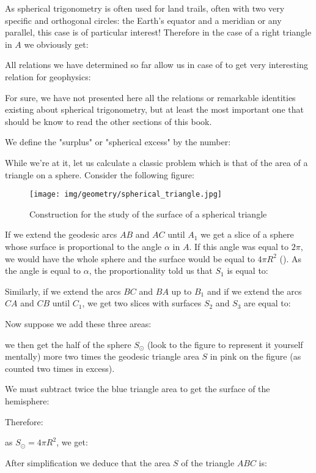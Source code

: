 	As spherical trigonometry is often used for land trails, often with two very specific and orthogonal circles: the Earth's equator and a meridian or any parallel, this case is of particular interest! Therefore in the case of a right triangle in $A$ we obviously get:
	
	All relations we have determined so far allow us in case of to get very interesting relation for geophysics:
	
	For sure, we have not presented here all the relations or remarkable identities existing about spherical trigonometry, but at least the most important one that should be know to read the other sections of this book.
	\begin{tcolorbox}[title=Remark,colframe=black,arc=10pt]
	We define the  "surplus" or "spherical excess" by the number:
	
	\end{tcolorbox}
	While we're at it, let us calculate a classic problem which is that of the area of a triangle on a sphere. Consider the following figure:
	\begin{figure}[H]
		\centering
		\texttt{[image: img/geometry/spherical\_triangle.jpg]}
		\caption[]{Construction for the study of the surface of a spherical triangle}
	\end{figure}
	If we extend the geodesic arcs $AB$ and $AC$ until $A_1$ we get a slice of a sphere whose surface is proportional to the angle $\alpha$ in $A$. If this angle was equal to $2\pi$, we would have the whole sphere and the surface would be equal to $4\pi R^2$ (). As the angle is equal to $\alpha$, the proportionality told us that $S_1$ is equal to:
	
	Similarly, if we extend the arcs $BC$ and $BA$ up to $B_1$ and if we extend the arcs $CA$ and $CB$ until $C_1$, we get two slices with surfaces $S_2$ and $S_3$ are equal to:
	
	Now suppose we add these three areas:
	
	we then get the half of the sphere $S_\odot$ (look to the figure to represent it yourself mentally) more two times the geodesic triangle area $S$ in pink on the figure (as counted two times in excess).
	
	We must subtract twice the blue triangle area to get the surface of the hemisphere:
	
	Therefore:
	
	as $S_\odot=4\pi R^2$, we get:
	
	After simplification we deduce that the area $S$ of the triangle $ABC$ is:
	
